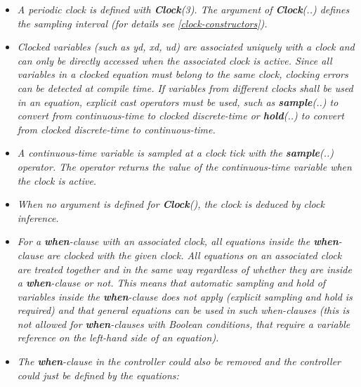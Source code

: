 \begin{itemize}
\item
  \emph{A periodic clock is defined with \textbf{Clock}(3). The argument
  of \textbf{Clock}(..) defines the sampling interval (for details see \autoref{clock-constructors}).}
\item
  \emph{Clocked variables (such as yd, xd, ud) are associated uniquely
  with a clock and can only be directly accessed when the associated
  clock is active. Since all variables in a clocked equation must belong
  to the same clock, clocking errors can be detected at compile time. If
  variables from different clocks shall be used in an equation, explicit
  cast operators must be used, such as \textbf{sample}(..) to convert
  from continuous-time to clocked discrete-time or \textbf{hold}(..) to
  convert from clocked discrete-time to continuous-time.}
\item
  \emph{A continuous-time variable is sampled at a clock tick with the
  \textbf{sample}(..) operator. The operator returns the value of the
  continuous-time variable when the clock is active.}
\item
  \emph{When no argument is defined for \textbf{Clock}(), the clock is
  deduced by clock inference.}
\item
  \emph{For a \textbf{when}-clause with an associated clock, all
  equations inside the \textbf{when}-clause are clocked with the given
  clock. All equations on an associated clock are treated together and
  in the same way regardless of whether they are inside a
  \textbf{when}-clause or not. This means that automatic sampling and
  hold of variables inside the \textbf{when}-clause does not apply
  (explicit sampling and hold is required) and that general equations
  can be used in such when-clauses (this is not allowed for
  \textbf{when}-clauses with Boolean conditions, that require a variable
  reference on the left-hand side of an equation).}
\item
  \emph{The \textbf{when}-clause in the controller could also be removed
  and the controller could just be defined by the equations:}
  

\end{itemize}
